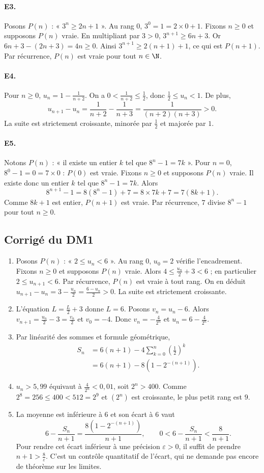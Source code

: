 \paragraph{E3.}Posons $P(n)$ : « $3^n\ge2n+1$ ». Au rang $0$, $3^0=1=2\times0+1$.
Fixons $n\ge0$ et supposons $P(n)$ vraie. En multipliant par $3>0$, $3^{n+1}\ge6n+3$. Or $6n+3-(2n+3)=4n\ge0$. Ainsi $3^{n+1}\ge2(n+1)+1$, ce qui est $P(n+1)$. Par récurrence, $P(n)$ est vraie pour tout $n\in\N$.

\paragraph{E4.}Pour $n\ge0$, $u_n=1-\frac{1}{n+2}$. On a $0<\frac{1}{n+2}\le\frac{1}{2}$, donc $\frac{1}{2}\le u_n<1$. De plus,
\[u_{n+1}-u_n=\frac1{n+2}-\frac1{n+3}=\frac1{(n+2)(n+3)}>0.\]
La suite est strictement croissante, minorée par $\frac{1}{2}$ et majorée par $1$.

\paragraph{E5.}Notons $P(n)$ : « il existe un entier $k$ tel que $8^n-1=7k$ ». Pour $n=0$, $8^0-1=0=7\times0$ : $P(0)$ est vraie.
Fixons $n\ge0$ et supposons $P(n)$ vraie. Il existe donc un entier $k$ tel que $8^n-1=7k$. Alors
\[8^{n+1}-1=8(8^n-1)+7=8\times7k+7=7(8k+1).\]
Comme $8k+1$ est entier, $P(n+1)$ est vraie. Par récurrence, $7$ divise $8^n-1$ pour tout $n\ge0$.

\subsection{Corrigé du DM1}\begin{enumerate}
\item Posons $P(n)$ : « $2\le u_n<6$ ». Au rang $0$, $u_0=2$ vérifie l'encadrement. Fixons $n\ge0$ et supposons $P(n)$ vraie. Alors $4\le \frac{u_n}{2}+3<6$ ; en particulier $2\le u_{n+1}<6$. Par récurrence, $P(n)$ est vraie à tout rang. On en déduit $u_{n+1}-u_n=3-\frac{u_n}{2}=\frac{6-u_n}{2}>0$. La suite est strictement croissante.
\item L'équation $L=\frac{L}{2}+3$ donne $L=6$. Posons $v_n=u_n-6$. Alors $v_{n+1}=\frac{u_n}{2}-3=\frac{v_n}{2}$ et $v_0=-4$. Donc $v_n=-\frac{4}{2^n}$ et $u_n=6-\frac{4}{2^n}$.
\item Par linéarité des sommes et formule géométrique,
\[\begin{aligned}S_n&=6(n+1)-4\sum_{k=0}^n(\frac{1}{2})^k\\&=6(n+1)-8(1-2^{-(n+1)}).\end{aligned}\]
\item $u_n>5{,}99$ équivaut à $\frac{4}{2^n}<0{,}01$, soit $2^n>400$. Comme $2^8=256\le400<512=2^9$ et $(2^n)$ est croissante, le plus petit rang est $9$.
\item La moyenne est inférieure à $6$ et son écart à $6$ vaut
\[6-\frac{S_n}{n+1}=\frac{8(1-2^{-(n+1)})}{n+1},\qquad 0<6-\frac{S_n}{n+1}<\frac8{n+1}.\]
Pour rendre cet écart inférieur à une précision $\varepsilon>0$, il suffit de prendre $n+1>\frac{8}{\varepsilon}$. C'est un contrôle quantitatif de l'écart, qui ne demande pas encore de théorème sur les limites.
\end{enumerate}

